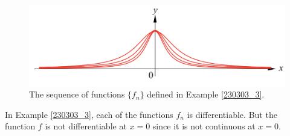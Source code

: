 \begin{figure}[ht]
\centering
\includegraphics[scale=0.18]{Picture53.png}
\caption{The sequence of functions $\{f_n\}$ defined in Example \ref{230303_3}.\fa}\label{figure53}
\end{figure}

\begin{highlight}{}
In Example \ref{230303_3}, each of the functions $f_n$ is differentiable. But the function $f$ is not differentiable at $x=0$ since it is not continuous at $x=0$.

\end{highlight}

